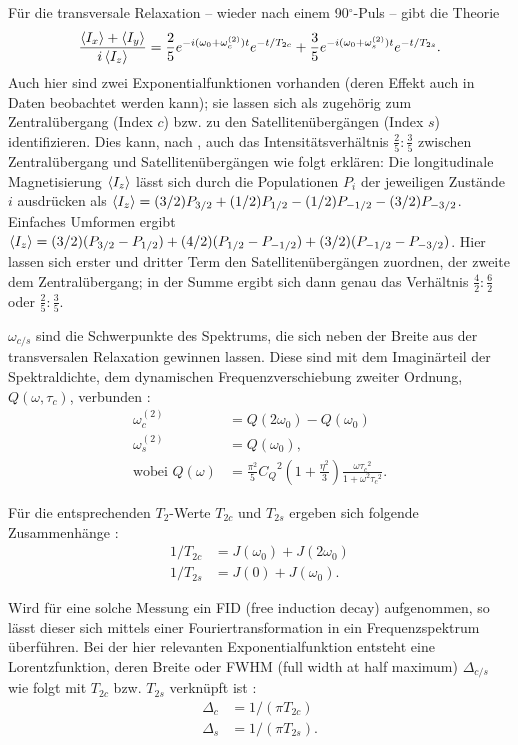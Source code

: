 Für die transversale Relaxation -- wieder nach einem 90$^\circ$-Puls -- gibt die Theorie \cite{werbelow}
\begin{align}
    \frac{\Braket{I_x} + \Braket{I_y}}{i\Braket{I_z}} = \frac{2}{5}e^{-i(\omega_0 + \omega_c^{(2)})t}e^{-t/T_{2c}} + \frac{3}{5}e^{-i(\omega_0 + \omega_s^{(2)})t}e^{-t/T_{2s}}. \label{eqn:trans_relax}
\end{align}
Auch hier sind zwei Exponentialfunktionen vorhanden (deren Effekt auch in Daten beobachtet werden kann); sie lassen sich als zugehörig zum Zentralübergang (Index $c$) bzw. zu den Satellitenübergängen (Index $s$) identifizieren. Dies kann, nach \cite{werbelow}, auch das Intensitätsverhältnis $\frac{2}{5}:\frac{3}{5}$ zwischen Zentralübergang und Satellitenübergängen wie folgt erklären: Die longitudinale Magnetisierung $\Braket{I_z}$ lässt sich durch die Populationen $P_i$ der jeweiligen Zustände $i$ ausdrücken als $\Braket{I_z} = (3/2)P_{3/2} + (1/2)P_{1/2} - (1/2)P_{-1/2} - (3/2)P_{-3/2}$. Einfaches Umformen ergibt $\Braket{I_z} = (3/2)(P_{3/2} - P_{1/2}) + (4/2)(P_{1/2} - P_{-1/2}) + (3/2)(P_{-1/2} - P_{-3/2})$. Hier lassen sich erster und dritter Term den Satellitenübergängen zuordnen, der zweite dem Zentralübergang; in der Summe ergibt sich dann genau das Verhältnis $\frac{4}{2}:\frac{6}{2}$ oder $\frac{2}{5}:\frac{3}{5}$.

$\omega_{c/s}$ sind die Schwerpunkte des Spektrums, die sich neben der Breite aus der transversalen Relaxation gewinnen lassen. Diese sind mit dem Imaginärteil der Spektraldichte, dem dynamischen Frequenzverschiebung zweiter Ordnung, $Q(\omega, \tau_c)$, verbunden \cite{eckert}:
\begin{align}
    \omega_c^{(2)} &= Q(2\omega_0) - Q(\omega_0) \\ \label{eqn:schwerpunkt}
    \omega_s^{(2)} &= Q(\omega_0), \\
    \text{wobei } Q(\omega) &= \frac{\pi^2}{5} {C_Q}^2 \left( 1 + \frac{\eta^2}{3} \right) \frac{\omega {\tau_c}^2}{1 + \omega^2 {\tau_c}^2}.
\end{align}

Für die entsprechenden $T_2$-Werte $T_{2c}$ und $T_{2s}$ ergeben sich folgende Zusammenhänge \cite{eckert}:
\begin{align}
    1/T_{2c} &= J(\omega_0) + J(2\omega_0) \label{eqn:theo:T_2_dyn} \\
    1/T_{2s} &= J(0) + J(\omega_0).
\end{align}

Wird für eine solche Messung ein FID (free induction decay) aufgenommen, so lässt dieser sich mittels einer Fouriertransformation in ein Frequenzspektrum überführen. Bei der hier relevanten Exponentialfunktion entsteht eine Lorentzfunktion, deren Breite oder FWHM (full width at half maximum) $\Delta_{c/s}$ wie folgt mit $T_{2c}$ bzw. $T_{2s}$ verknüpft ist \cite{werbelow}:
\begin{align}
    \Delta_c &= 1/(\pi T_{2c}) \\ \label{eqn:fwhm}
    \Delta_s &= 1/(\pi T_{2s}).
\end{align}

